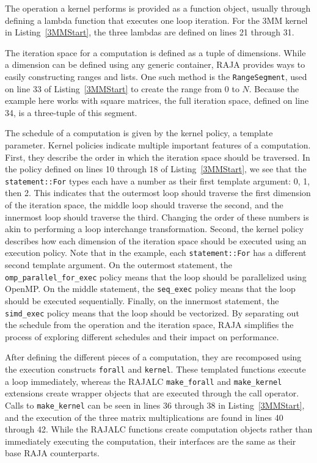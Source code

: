 The operation a kernel performs is provided as a function object, usually through defining a lambda function that executes one loop iteration.
For the 3MM kernel in Listing~\ref{3MMStart}, the three lambdas are defined on lines 21 through 31. 

The iteration space for a computation is defined as a tuple of dimensions.
While a dimension can be defined using any generic container, RAJA provides ways to easily constructing ranges and lists.
One such method is the \verb.RangeSegment., used on line 33 of Listing~\ref{3MMStart} to create the range from $0$ to $N$. 
Because the example here works with square matrices, the full iteration space, defined on line 34, is a three-tuple of this segment. 

The schedule of a computation is given by the kernel policy, a template parameter. 
Kernel policies indicate multiple important features of a computation.
First, they describe the order in which the iteration space should be traversed.
In the policy defined on lines 10 through 18 of Listing~\ref{3MMStart}, we see that the \verb.statement::For. types each have a number as their first template argument: 0, 1, then 2.
This indicates that the outermost loop should traverse the first dimension of the iteration space, the middle loop should traverse the second, and the innermost loop should traverse the third. 
Changing the order of these numbers is akin to performing a loop interchange transformation.
Second, the kernel policy describes how each dimension of the iteration space should be executed using an execution policy.
Note that in the example, each \verb.statement::For. has a different second template argument.
On the outermost statement, the \verb.omp_parallel_for_exec. policy means that the loop should be parallelized using OpenMP. 
On the middle statement, the \verb.seq_exec. policy means that the loop should be executed sequentially.
Finally, on the innermost statement, the \verb.simd_exec. policy means that the loop should be vectorized.
By separating out the schedule from the operation and the iteration space, RAJA simplifies the process of exploring different schedules and their impact on performance.

After defining the different pieces of a computation, they are recomposed using the execution constructs \verb.forall. and \verb.kernel..
These templated functions execute a loop immediately, whereas the RAJALC \verb.make_forall. and \verb.make_kernel. extensions create wrapper objects that are executed through the call operator. 
Calls to \verb.make_kernel. can be seen in lines 36 through 38 in Listing~\ref{3MMStart}, and the execution of the three matrix multiplications are found in lines 40 through 42. 
While the RAJALC functions create computation objects rather than immediately executing the computation, their interfaces are the same as their base RAJA counterparts.

